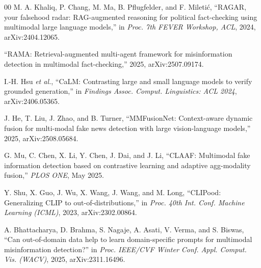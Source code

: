 \documentclass[conference,a4paper]{IEEEtran}
\begin{document}
\begin{thebibliography}{00}
 M. A. Khaliq, P. Chang, M. Ma, B. Pflugfelder, and
F. Mileti\'{c}, ``RAGAR, your falsehood radar: RAG-augmented reasoning for
political fact-checking using multimodal large language models,'' in
\emph{Proc. 7th FEVER Workshop, ACL}, 2024, arXiv:2404.12065.

 ``RAMA: Retrieval-augmented multi-agent framework for
misinformation detection in multimodal fact-checking,'' 2025,
arXiv:2507.09174.

 I.-H. Hsu \emph{et al.}, ``CaLM: Contrasting large and small
language models to verify grounded generation,'' in \emph{Findings Assoc.
Comput. Linguistics: ACL 2024}, arXiv:2406.05365.

 J. He, T. Liu, J. Zhao, and B. Turner,
``MMFusionNet: Context-aware dynamic fusion for multi-modal fake news
detection with large vision-language models,'' 2025, arXiv:2508.05684.

 G. Mu, C. Chen, X. Li, Y. Chen, J. Dai, and J. Li,
``CLAAF: Multimodal fake information detection based on contrastive learning
and adaptive agg-modality fusion,'' \emph{PLOS ONE}, May 2025.

 Y. Shu, X. Guo, J. Wu, X. Wang, J. Wang, and M. Long,
``CLIPood: Generalizing CLIP to out-of-distributions,'' in \emph{Proc. 40th
Int. Conf. Machine Learning (ICML)}, 2023, arXiv:2302.00864.

 A. Bhattacharya, D. Brahma, S. Nagaje, A. Asati, V. Verma, and
S. Biswas, ``Can out-of-domain data help to learn domain-specific prompts for
multimodal misinformation detection?'' in \emph{Proc. IEEE/CVF Winter Conf.
Appl. Comput. Vis. (WACV)}, 2025, arXiv:2311.16496.

\end{thebibliography}
\end{document}
